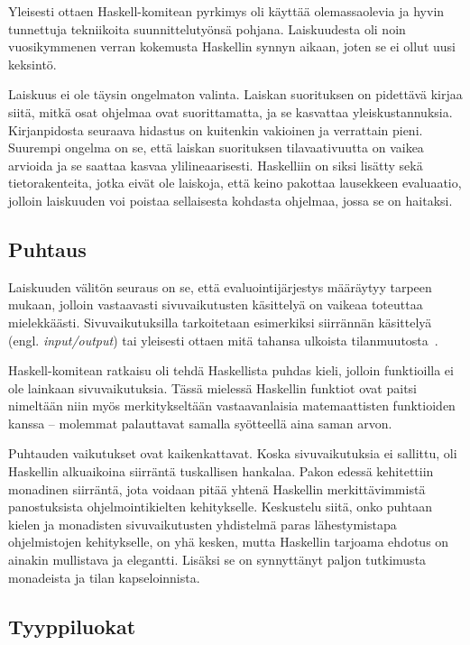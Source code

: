 \documentclass[finnish]{tktltiki2}
\begin{document}
Yleisesti ottaen Haskell-komitean pyrkimys oli käyttää olemassaolevia ja hyvin tunnettuja
tekniikoita suunnittelutyönsä pohjana. Laiskuudesta oli noin vuosikymmenen verran kokemusta
Haskellin synnyn aikaan, joten se ei ollut uusi keksintö.

Laiskuus ei ole täysin ongelmaton valinta. Laiskan suorituksen on pidettävä kirjaa siitä, mitkä osat
ohjelmaa ovat suorittamatta, ja se kasvattaa yleiskustannuksia. Kirjanpidosta seuraava hidastus on
kuitenkin vakioinen ja verrattain pieni. Suurempi ongelma on se, että laiskan suorituksen
tilavaativuutta on vaikea arvioida ja se saattaa kasvaa ylilineaarisesti. Haskelliin on siksi
lisätty sekä tietorakenteita, jotka eivät ole laiskoja, että keino pakottaa lausekkeen evaluaatio,
jolloin laiskuuden voi poistaa sellaisesta kohdasta ohjelmaa, jossa se on haitaksi.

\subsection{Puhtaus}

Laiskuuden välitön seuraus on se, että evaluointijärjestys määräytyy tarpeen mukaan, jolloin
vastaavasti sivuvaikutusten käsittelyä on vaikeaa toteuttaa mielekkäästi. Sivuvaikutuksilla
tarkoitetaan esimerkiksi siirrännän käsittelyä (engl. \emph{input/output}) tai yleisesti ottaen mitä
tahansa ulkoista tilanmuutosta~.

Haskell-komitean ratkaisu oli tehdä Haskellista puhdas kieli, jolloin funktioilla ei ole lainkaan
sivuvaikutuksia. Tässä mielessä Haskellin funktiot ovat paitsi nimeltään niin myös merkitykseltään
vastaavanlaisia matemaattisten funktioiden kanssa -- molemmat palauttavat samalla syötteellä aina
saman arvon.

Puhtauden vaikutukset ovat kaikenkattavat. Koska sivuvaikutuksia ei sallittu, oli Haskellin
alkuaikoina siirräntä tuskallisen hankalaa. Pakon edessä kehitettiin monadinen siirräntä, jota
voidaan pitää yhtenä Haskellin merkittävimmistä panostuksista ohjelmointikielten kehitykselle.
Keskustelu siitä, onko puhtaan kielen ja monadisten sivuvaikutusten yhdistelmä paras lähestymistapa
ohjelmistojen kehitykselle, on yhä kesken, mutta Haskellin tarjoama ehdotus on ainakin mullistava ja
elegantti. Lisäksi se on synnyttänyt paljon tutkimusta monadeista ja tilan kapseloinnista.

\subsection{Tyyppiluokat}
\end{document}
